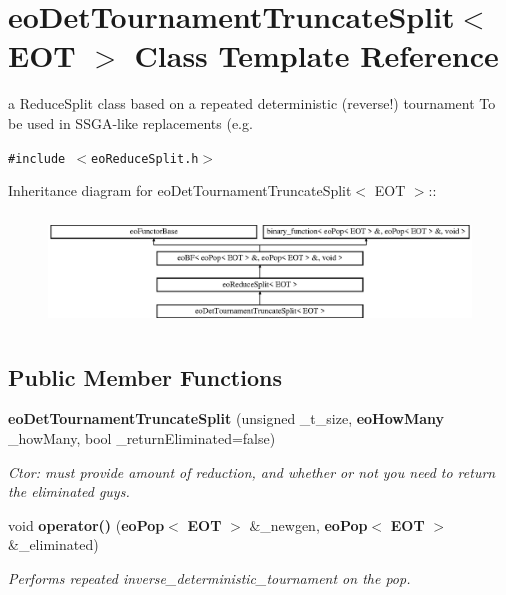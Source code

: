\section{eo\-Det\-Tournament\-Truncate\-Split$<$ EOT $>$ Class Template Reference}
\label{classeo_det_tournament_truncate_split}
a Reduce\-Split class based on a repeated deterministic (reverse!) tournament To be used in SSGA-like replacements (e.g.  


{\tt \#include $<$eo\-Reduce\-Split.h$>$}

Inheritance diagram for eo\-Det\-Tournament\-Truncate\-Split$<$ EOT $>$::\begin{figure}[H]
\begin{center}
\leavevmode
\includegraphics[height=3.01075cm]{classeo_det_tournament_truncate_split}
\end{center}
\end{figure}
\subsection*{Public Member Functions}
\begin{CompactItemize}
\item 
{\bf eo\-Det\-Tournament\-Truncate\-Split} (unsigned \_\-t\_\-size, {\bf eo\-How\-Many} \_\-how\-Many, bool \_\-return\-Eliminated=false)\label{classeo_det_tournament_truncate_split_a0}

\begin{CompactList}\small\item\em Ctor: must provide amount of reduction, and whether or not you need to return the eliminated guys. \item\end{CompactList}\item 
void {\bf operator()} ({\bf eo\-Pop}$<$ {\bf EOT} $>$ \&\_\-newgen, {\bf eo\-Pop}$<$ {\bf EOT} $>$ \&\_\-eliminated)\label{classeo_det_tournament_truncate_split_a1}

\begin{CompactList}\small\item\em Performs repeated inverse\_\-deterministic\_\-tournament on the pop. \item\end{CompactList}\end{CompactItemize}
